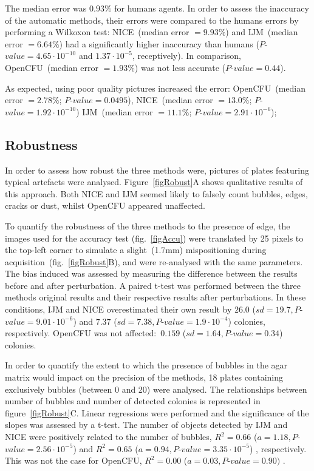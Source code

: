 \documentclass[10pt]{article}
\newcommand{\IJM}{IJM}
\newcommand{\EdgeNoiseOCFU}{$0.159$ ($sd=1.64, P$-$value=0.34$)}
\newcommand{\EdgeNoiseIJM}{$26.0$ ($sd=19.7, P$-$value=9.01\cdot 10^{-6}$)}
\newcommand{\EdgeNoiseNICE}{$7.37$ ($sd=7.38,P$-$value=1.9\cdot 10^{-4}$)}
\newcommand{\BubbleNoiseOCFU}{$R^2 = 0.00$ ($a=0.03, P$-$value=0.90)$ }
\newcommand{\BubbleNoiseNICE}{$R^2 = 0.65$ ($a=0.94, P$-$value=3.35\cdot 10^{-5}$) }
\newcommand{\BubbleNoiseIJM}{$R^2 = 0.66$ ($a=1.18, P$-$value=2.56\cdot 10^{-5}$) }
\begin{document}
The median error was $0.93\%$ for humans agents. In order to assess the
inaccuracy of the automatic methods, their errors were compared to the humans
errors by performing a Wilkoxon test:
NICE~(median error $= 9.93\%$) and \IJM{}~(median error $= 6.64\%$) had a significantly higher inaccuracy than
humans ($P$-$value = 4.65\cdot 10^{-10}$ and $1.37\cdot 10^{-5}$, receptively).
In comparison, OpenCFU~(median error $= 1.93\%$) was not less accurate ($P$-$value = 0.44$).

As expected, using poor quality pictures increased the error: OpenCFU~(median error $= 2.78\%$; $P$-$value =
0.0495$), NICE~(median error $= 13.0\%$; $P$-$value = 1.92 \cdot 10^{-10}$) \IJM{}~(median error $= 11.1\%$; $P$-$value = 2.91 \cdot 10^{-6} $);

\subsection*{Robustness} 
In order to assess how robust the three methods were,
pictures of plates featuring typical artefacts were analysed.
Figure~\ref{figRobust}A shows qualitative results of this approach.
Both NICE and \IJM{} seemed likely to falsely count bubbles, edges, cracks or
dust, whilst OpenCFU appeared unaffected.

To quantify the robustness of the three methods to the presence of edge, the
images used for the accuracy test (fig.~\ref{figAccu}) were translated by 25 pixels to the top-left
corner to simulate a slight~(1.7mm) mispositioning during
acquisition~(fig.~\ref{figRobust}B), and were re-analysed with the same
parameters.
The bias induced was assessed by measuring the difference between the results
before and after perturbation. A paired t-test was performed between the three
methods original results and their respective results after perturbations.
In these conditions, \IJM{} and NICE overestimated their own result by
\EdgeNoiseIJM{} and \EdgeNoiseNICE{} colonies, respectively. OpenCFU was not affected:~\EdgeNoiseOCFU{} colonies.

In order to quantify the extent to which the presence of bubbles in the agar matrix would impact on
the precision of the methods, 18 plates containing exclusively bubbles (between
0 and 20) were analysed. The relationships between number of bubbles and number
of detected colonies is represented in figure~\ref{figRobust}C. Linear
regressions were performed and the significance of the slopes was assessed by a
t-test. The number of objects detected by \IJM{} and NICE were positively
related to the number of bubbles, \BubbleNoiseIJM and \BubbleNoiseNICE,
respectively. This was not the case for OpenCFU, \BubbleNoiseOCFU.
\end{document}
